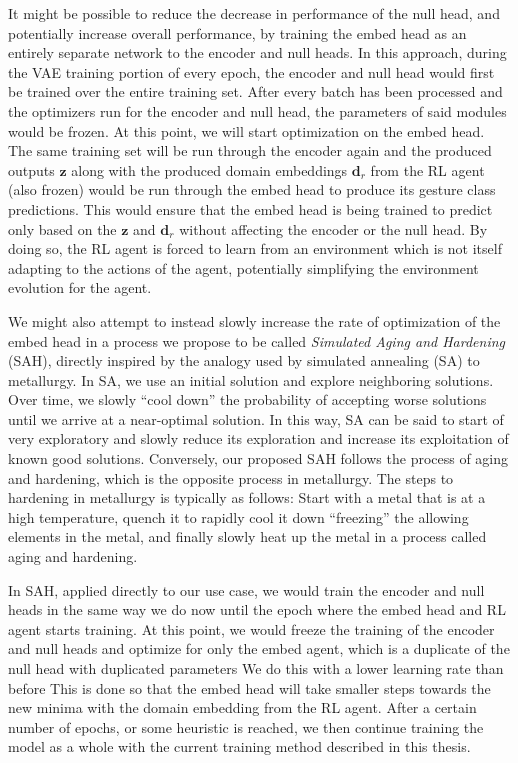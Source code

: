 It might be possible to reduce the decrease in performance of the null head, and potentially increase overall performance, by training the embed head as an entirely separate network to the encoder and null heads.
In this approach, during the VAE training portion of every epoch, the encoder and null head would first be trained over the entire training set.
After every batch has been processed and the optimizers run for the encoder and null head, the parameters of said modules would be frozen.
At this point, we will start optimization on the embed head.
The same training set will be run through the encoder again and the produced outputs $\boldsymbol{z}$ along with the produced domain embeddings $\boldsymbol{d}_r$ from the RL agent (also frozen) would be run through the embed head to produce its gesture class predictions.
This would ensure that the embed head is being trained to predict only based on the $\boldsymbol{z}$ and $\boldsymbol{d}_r$ without affecting the encoder or the null head.
By doing so, the RL agent is forced to learn from an environment which is not itself adapting to the actions of the agent, potentially simplifying the environment evolution for the agent.

We might also attempt to instead slowly increase the rate of optimization of the embed head in a process we propose to be called \textit{Simulated Aging and Hardening} (SAH), directly inspired by the analogy used by simulated annealing (SA) to metallurgy.
In SA, we use an initial solution and explore neighboring solutions. 
Over time, we slowly ``cool down'' the probability of accepting worse solutions until we arrive at a near-optimal solution.
In this way, SA can be said to start of very exploratory and slowly reduce its exploration and increase its exploitation of known good solutions.
Conversely, our proposed SAH follows the process of aging and hardening, which is the opposite process in metallurgy.
The steps to hardening in metallurgy is typically as follows: Start with a metal that is at a high temperature, quench it to rapidly cool it down ``freezing'' the allowing elements in the metal, and finally slowly heat up the metal in a process called aging and hardening.

In SAH, applied directly to our use case, we would train the encoder and null heads in the same way we do now until the epoch where the embed head and RL agent starts training.
At this point, we would freeze the training of the encoder and null heads and optimize for only the embed agent, which is a duplicate of the null head with duplicated parameters
We do this with a lower learning rate than before
This is done so that the embed head will take smaller steps towards the new minima with the domain embedding from the RL agent.
After a certain number of epochs, or some heuristic is reached, we then continue training the model as a whole with the current training method described in this thesis.